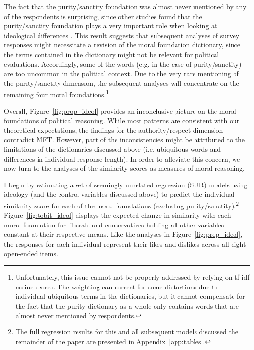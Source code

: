 \documentclass[12pt]{article}
\begin{document}
The fact that the purity/sanctity foundation was almost never mentioned by any of the respondents is surprising, since other studies found that the purity/sanctity foundation plays a very important role when looking at ideological differences \citep{koleva2012tracing}. This result suggests that subsequent analyses of survey responses might necessitate a revision of the moral foundation dictionary, since the terms contained in the dictionary might not be relevant for political evaluations. Accordingly, some of the words (e.g. in the case of purity/sanctity) are too uncommon in the political context. Due to the very rare mentioning of the purity/sanctity dimension, the subsequent analyses will concentrate on the remaining four moral foundations.\footnote{Unfortunately, this issue cannot not be properly addressed by relying on tf-idf cosine scores. The weighting can correct for some distortions due to individual ubiquitous terms in the dictionaries, but it cannot compensate for the fact that the purity dictionary as a whole only contains words that are almost never mentioned by respondents.}

Overall, Figure~\ref{fig:prop_ideol} provides an inconclusive picture on the moral foundations of political reasoning. While most patterns are consistent with our theoretical expectations, the findings for the authority/respect dimension contradict MFT. However, part of the inconsistencies might be attributed to the limitations of the dictionaries discussed above (i.e. ubiquitous words and differences in individual response length). In order to alleviate this concern, we now turn to the analyses of the similarity scores as measures of moral reasoning.

I begin by estimating a set of seemingly unrelated regression (SUR) models using ideology (and the control variables discussed above) to predict the individual similarity score for each of the moral foundations (excluding purity/sanctity).\footnote{The full regression results for this and all subsequent models discussed the remainder of the paper are presented in Appendix~\ref{app:tables}.} Figure~\ref{fig:tobit_ideol} displays the expected change in similarity with each moral foundation for liberals and conservatives holding all other variables constant at their respective means. Like the analyses in Figure~\ref{fig:prop_ideol}, the responses for each individual represent their likes and dislikes across all eight open-ended items.
\end{document}
